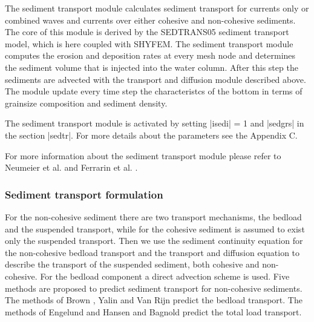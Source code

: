 
%
%
%
%
%
%
%

The sediment transport module calculates sediment transport for currents 
only or combined waves and currents over either cohesive and non-cohesive
sediments. The core of this module is derived by the SEDTRANS05 
sediment transport model, which is here coupled with SHYFEM. The sediment 
transport module computes the erosion and deposition rates at every mesh 
node and determines the sediment volume that is injected into the water 
column. After this step the sediments are advected with the transport and 
diffusion module described above. The module update every time step the 
characteristcs of the bottom in terms of grainsize composition and 
sediment density.

The sediment transport module is activated by setting |isedi| = 1 
and |sedgrs| in the section |sedtr|. 
For more details about the parameters see the Appendix C.

For more information about the sediment transport module please refer 
to Neumeier et al. \cite{urs:sedtrans05} and Ferrarin et al. 
\cite{ferrarin:morpho08}.

\subsubsection{Sediment transport formulation}
For the non-cohesive sediment there are two transport mechanisms, the 
bedload and the suspended transport, while for the cohesive sediment 
is assumed to exist only the suspended transport. Then we use the 
sediment continuity equation for the non-cohesive bedload transport 
and the transport and diffusion equation to describe the transport
of the suspended sediment, both cohesive and non-cohesive.
For the bedload component a direct advection scheme is used. 
Five methods are proposed to predict sediment transport for non-cohesive
sediments. The methods of Brown \cite{brown:engi}, Yalin \cite{yalin:bedload} 
and Van Rijn \cite{vanrijn93:prin} predict the bedload transport. The 
methods of Engelund and Hansen \cite{eh:momo} and Bagnold 
\cite{bagnolds:ma-sed} predict the total load transport.

